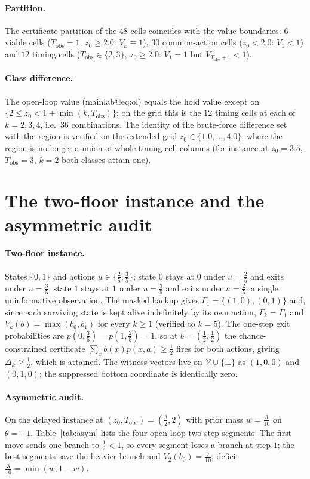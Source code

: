 \documentclass[11pt,a4paper]{article}
\makeatletter
\theoremstyle{plain}
\theoremstyle{definition}
\theoremstyle{remark}
\newcommand{\calV}{\mathcal{V}}
\newcommand{\Tobs}{T_{\mathrm{obs}}}
\newcommand{\tfr}[2]{\tfrac{#1}{#2}}
\newcommand{\mref}[1]{\csname mainlab@#1\endcsname}
\newcommand{\meqref}[1]{(\mref{#1})}
\makeatother
\begin{document}
\paragraph{Partition.} The certificate partition of the $48$ cells coincides with the value boundaries: $6$ viable cells ($\Tobs=1$, $z_0\ge2.0$: $V_k\equiv1$), $30$ common-action cells ($z_0<2.0$: $V_1<1$) and $12$ timing cells ($\Tobs\in\{2,3\}$, $z_0\ge2.0$: $V_1=1$ but $V_{\Tobs+1}<1$).

\paragraph{Class difference.} The open-loop value \meqref{eq:ol} equals the hold value except on $\{2\le z_0<1+\min(k,\Tobs)\}$; on the grid this is the $12$ timing cells at each of $k=2,3,4$, i.e.\ $36$ combinations. The identity of the brute-force difference set with the region is verified on the extended grid $z_0\in\{1.0,\dots,4.0\}$, where the region is no longer a union of whole timing-cell columns (for instance at $z_0=3.5$, $\Tobs=3$, $k=2$ both classes attain one).
\section{The two-floor instance and the asymmetric audit}\label{si:instances}

\paragraph{Two-floor instance.} States $\{0,1\}$ and actions $u\in\{\tfr25,\tfr35\}$; state $0$ stays at $0$ under $u=\tfr25$ and exits under $u=\tfr35$, state $1$ stays at $1$ under $u=\tfr35$ and exits under $u=\tfr25$; a single uninformative observation. The masked backup gives $\Gamma_1=\{(1,0),(0,1)\}$ and, since each surviving state is kept alive indefinitely by its own action, $\Gamma_k=\Gamma_1$ and $V_k(b)=\max(b_0,b_1)$ for every $k\ge1$ (verified to $k=5$). The one-step exit probabilities are $p(0,\tfr35)=p(1,\tfr25)=1$, so at $b=(\tfr12,\tfr12)$ the chance-constrained certificate $\sum_xb(x)p(x,a)\ge\tfr12$ fires for both actions, giving $\Delta_k\ge\tfr12$, which is attained. The witness vectors live on $\calV\cup\{\bot\}$ as $(1,0,0)$ and $(0,1,0)$; the suppressed bottom coordinate is identically zero.

\paragraph{Asymmetric audit.} On the delayed instance at $(z_0,\Tobs)=(\tfr32,2)$ with prior mass $w=\tfr3{10}$ on $\theta=+1$, Table~\ref{tab:asym} lists the four open-loop two-step segments. The first move sends one branch to $\tfr12<1$, so every segment loses a branch at step $1$; the best segments save the heavier branch and $V_2(b_0)=\tfr7{10}$, deficit $\tfr3{10}=\min(w,1-w)$.
\end{document}
